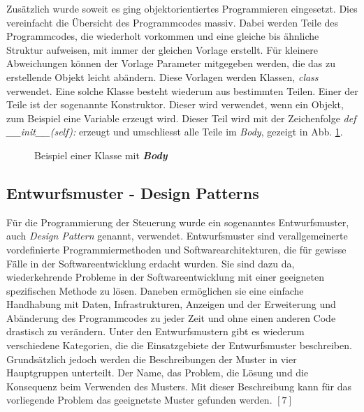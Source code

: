 Zusätzlich wurde soweit es ging objektorientiertes Programmieren eingesetzt. Dies vereinfacht die Übersicht des Programmcodes massiv. Dabei werden Teile des Programmcodes, die wiederholt vorkommen und eine gleiche bis ähnliche Struktur aufweisen, mit immer der gleichen Vorlage erstellt. Für kleinere Abweichungen können der Vorlage Parameter mitgegeben werden, die das zu erstellende Objekt leicht abändern. Diese Vorlagen werden Klassen, \textit{class} verwendet. Eine solche Klasse besteht wiederum aus bestimmten Teilen. Einer der Teile ist der sogenannte Konstruktor. Dieser wird verwendet, wenn ein Objekt, zum Beispiel eine Variable erzeugt wird. Dieser Teil wird mit der Zeichenfolge \textit{def \_\_init\_\_(self):} erzeugt und umschliesst alle Teile im \textit{Body}, gezeigt in Abb. \ref{fig:class_example}.\\

\begin{figure}
    \centering
    \caption{Beispiel einer Klasse mit \textit{\textbf{Body}}}
    \label{fig:class_example}
\end{figure}

\subsection{Entwurfsmuster - Design Patterns}
Für die Programmierung der Steuerung wurde ein sogenanntes Entwurfsmuster, auch \textit{Design Pattern} genannt, verwendet. Entwurfsmuster sind verallgemeinerte vordefinierte Programmiermethoden und Softwarearchitekturen, die für gewisse Fälle in der Softwareentwicklung erdacht wurden. Sie sind dazu da, wiederkehrende Probleme in der Softwareentwicklung mit einer geeigneten spezifischen Methode zu lösen. Daneben ermöglichen sie eine einfache Handhabung mit Daten, Infrastrukturen, Anzeigen und der Erweiterung und Abänderung des Programmcodes zu jeder Zeit und ohne einen anderen Code drastisch zu verändern. Unter den Entwurfsmustern gibt es wiederum verschiedene Kategorien, die die Einsatzgebiete der Entwurfsmuster beschreiben. Grundsätzlich jedoch werden die Beschreibungen der Muster in vier Hauptgruppen unterteilt. Der Name, das Problem, die Lösung und die Konsequenz beim Verwenden des Musters. Mit dieser Beschreibung kann für das vorliegende Problem das geeignetste Muster gefunden werden. $[7]$


